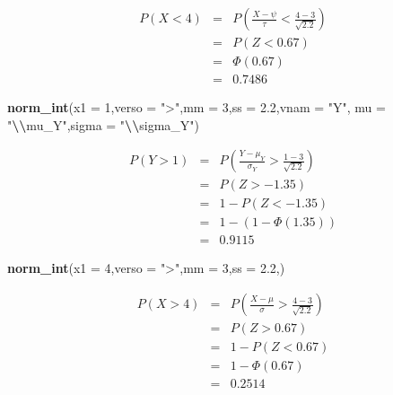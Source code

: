\documentclass[
  11pt,
]{book}
\newenvironment{Shaded}{\begin{snugshade}}{\end{snugshade}}
\newcommand{\AttributeTok}[1]{\textcolor[rgb]{0.13,0.29,0.53}{#1}}
\newcommand{\DecValTok}[1]{\textcolor[rgb]{0.00,0.00,0.81}{#1}}
\newcommand{\FloatTok}[1]{\textcolor[rgb]{0.00,0.00,0.81}{#1}}
\newcommand{\FunctionTok}[1]{\textcolor[rgb]{0.13,0.29,0.53}{\textbf{#1}}}
\newcommand{\NormalTok}[1]{#1}
\newcommand{\SpecialCharTok}[1]{\textcolor[rgb]{0.81,0.36,0.00}{\textbf{#1}}}
\newcommand{\StringTok}[1]{\textcolor[rgb]{0.31,0.60,0.02}{#1}}
\theoremstyle{mytheoremstyle}
\theoremstyle{mydefstyle}
\begin{document}
\begin{eqnarray*}
      P( X   <   4 ) 
        &=& P\left(  \frac { X  -  \psi }{ \tau }  <  \frac { 4  -  3 }{\sqrt{ 2.2 }} \right)  \\
                 &=& P\left(  Z   <   0.67 \right) \\    
                 &=&  \Phi( 0.67 ) \\ &=&  0.7486 
      \end{eqnarray*}

\begin{Shaded}
\begin{Highlighting}[]
\FunctionTok{norm\_int}\NormalTok{(}\AttributeTok{x1 =} \DecValTok{1}\NormalTok{,}\AttributeTok{verso =} \StringTok{"\textgreater{}"}\NormalTok{,}\AttributeTok{mm =} \DecValTok{3}\NormalTok{,}\AttributeTok{ss =} \FloatTok{2.2}\NormalTok{,}\AttributeTok{vnam =} \StringTok{"Y"}\NormalTok{,}
             \AttributeTok{mu =} \StringTok{"}\SpecialCharTok{\textbackslash{}\textbackslash{}}\StringTok{mu\_Y"}\NormalTok{,}\AttributeTok{sigma =} \StringTok{"}\SpecialCharTok{\textbackslash{}\textbackslash{}}\StringTok{sigma\_Y"}\NormalTok{)}
\end{Highlighting}
\end{Shaded}

\begin{eqnarray*}
      P( Y   >   1 ) 
        &=& P\left(  \frac { Y  -  \mu_Y }{ \sigma_Y }  >  \frac { 1  -  3 }{\sqrt{ 2.2 }} \right)  \\
                 &=& P\left(  Z   >   -1.35 \right) \\    &=& 1-P(Z< -1.35 )\\ 
                 &=&  1-(1-\Phi( 1.35 )) \\ &=&  0.9115 
      \end{eqnarray*}

\begin{Shaded}
\begin{Highlighting}[]
\FunctionTok{norm\_int}\NormalTok{(}\AttributeTok{x1 =} \DecValTok{4}\NormalTok{,}\AttributeTok{verso =} \StringTok{"\textgreater{}"}\NormalTok{,}\AttributeTok{mm =} \DecValTok{3}\NormalTok{,}\AttributeTok{ss =} \FloatTok{2.2}\NormalTok{,)}
\end{Highlighting}
\end{Shaded}

\begin{eqnarray*}
      P( X   >   4 ) 
        &=& P\left(  \frac { X  -  \mu }{ \sigma }  >  \frac { 4  -  3 }{\sqrt{ 2.2 }} \right)  \\
                 &=& P\left(  Z   >   0.67 \right) \\    &=& 1-P(Z< 0.67 )\\ 
                 &=&  1-\Phi( 0.67 ) \\ &=&  0.2514 
      \end{eqnarray*}
\end{document}
